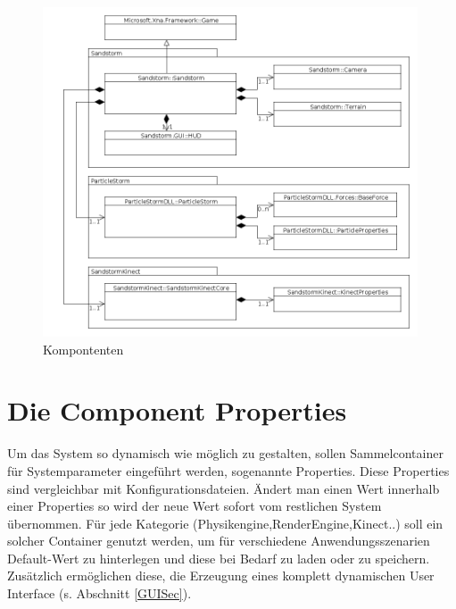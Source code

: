 \begin{Spacing}{\mylinespace}
\begin{figure}[h!]
	\centering
	\vspace*{20px}
	\includegraphics[width=0.99\textwidth]{graphics/overview.png}
	\caption{Kompontenten}
	\label{fig:component}
\end{figure}

\section{Die Component Properties} \label{PropSec}
Um das  System so dynamisch wie möglich zu gestalten, sollen Sammelcontainer für Systemparameter eingeführt werden, sogenannte Properties.
Diese Properties sind vergleichbar mit Konfigurationsdateien. Ändert man einen Wert innerhalb einer Properties so wird der neue Wert sofort vom restlichen System übernommen. Für jede Kategorie (Physikengine,RenderEngine,Kinect..) soll ein solcher Container genutzt werden, um für verschiedene Anwendungsszenarien Default-Wert zu hinterlegen und diese bei Bedarf zu laden oder zu speichern. Zusätzlich ermöglichen diese, die Erzeugung eines komplett dynamischen User Interface (s. Abschnitt \ref{GUISec}).

\end{Spacing}
\newpage
\clearpage
